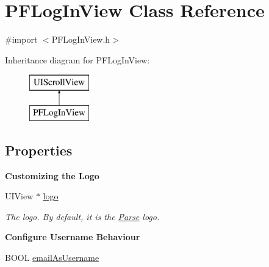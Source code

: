 \hypertarget{interface_p_f_log_in_view}{}\section{P\+F\+Log\+In\+View Class Reference}
\label{interface_p_f_log_in_view}


{\ttfamily \#import $<$P\+F\+Log\+In\+View.\+h$>$}

Inheritance diagram for P\+F\+Log\+In\+View\+:\begin{figure}[H]
\begin{center}
\leavevmode
\includegraphics[height=2.000000cm]{interface_p_f_log_in_view}
\end{center}
\end{figure}
\subsection*{Properties}
\begin{Indent}{\bf Customizing the Logo}\par
{\em 

 

 }\begin{DoxyCompactItemize}
\item 
\hypertarget{interface_p_f_log_in_view_a0d6b5139aea2f3c3a86b3093f7258455}{}U\+I\+View $\ast$ \hyperlink{interface_p_f_log_in_view_a0d6b5139aea2f3c3a86b3093f7258455}{logo}\label{interface_p_f_log_in_view_a0d6b5139aea2f3c3a86b3093f7258455}

\begin{DoxyCompactList}\small\item\em The logo. By default, it is the \hyperlink{interface_parse}{Parse} logo. \end{DoxyCompactList}\end{DoxyCompactItemize}
\end{Indent}
\begin{Indent}{\bf Configure Username Behaviour}\par
{\em 

 

 }\begin{DoxyCompactItemize}
\item 
B\+O\+O\+L \hyperlink{interface_p_f_log_in_view_a5158167a0a95cdf25f18e5fe23a8368b}{email\+As\+Username}
\end{DoxyCompactItemize}
\end{Indent}
